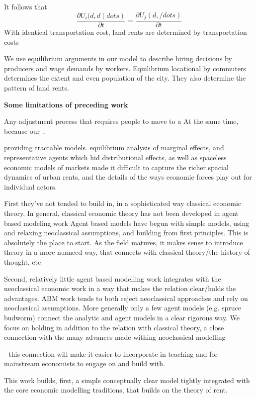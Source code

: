  It follows that 
\[\frac{\partial U_i(d, d(dots)}{\partial t}=\frac{\partial U_j(d, /dots)}{\partial t}\]
With identical transportation cost, 
land rents are determined by transportation costs  

We use  equilibrium arguments in our model to describe hiring decisions by producers and wage demands by workers. Equilibrium locational by commuters determines the extent and even population of the city. They also determine the pattern of land rents. 


\textbf{Some limitations of preceding work}%

Any adjustment process that requires people to move to a 
At the same time, because our ..

providing tractable models.  equilibrium analysis of marginal effects, and representative agents which hid distributional effects, as well as spaceless economic models of markets made it difficult to capture the richer spacial dynamics of urban rents, and the details of the ways economic forces play out for individual actors.

First they've not tended to build in, in a sophisticated way classical economic theory,
In general, classical economic theory has not been developed in agent based modeling work
Agent based models have begun with simple models, using and relaxing neoclassical assumptions, and building from first principles. This is absolutely the place to start. As the field matures, it makes sense to introduce theory in a more nuanced way, that connects with classical theory/the history of thought, etc

Second, relatively little agent based modelling work integrates with the neoclassical economic work in a way that makes the relation clear/holds the advantages. ABM work tends to both reject neoclassical approaches and rely on neoclassical assumptions.
More generally only a few agent models (e.g. spruce budworm) connect the analytic and agent models in a clear rigorous way. We focus on holding in addition to the relation with classical theory, a close connection with the many advances made withing neoclassical modelling

- this connection will make it easier to incorporate in teaching and for mainstream economists to engage on and build with.

This work builds, first, a simple conceptually clear model tightly integrated with the core economic modelling traditions, that builds on the theory of rent.

